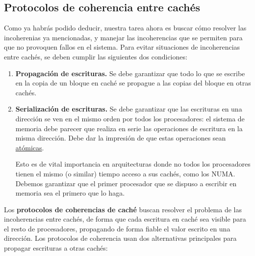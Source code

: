 \subsection{Protocolos de coherencia entre cachés}
Como ya habrás podido deducir, nuestra tarea ahora es buscar cómo resolver las incoherenias ya mencionadas, y manejar las incoherencias que se permiten para que no provoquen fallos en el sistema. Para evitar situaciones de incoherencias entre cachés, se deben cumplir las siguientes dos condiciones:
\begin{enumerate}
    \item \textbf{Propagación de escrituras.} Se debe garantizar que todo lo que se escribe en la copia de un bloque en caché se propague a las copias del bloque en otras cachés.
    \item \textbf{Serialización de escrituras.} Se debe garantizar que las escrituras en una dirección se ven en el mismo orden por todos los procesadores: el sistema de memoria debe parecer que realiza en serie las operaciones de escritura en la misma dirección. Debe dar la impresión de que estas operaciones sean \underline{atómicas}. 

        Esto es de vital importancia en arquitecturas donde no todos los procesadores tienen el mismo (o similar) tiempo acceso a sus cachés, como los NUMA\@. Debemos garantizar que el primer procesador que se dispuso a escribir en memoria sea el primero que lo haga.
\end{enumerate}
Los \textbf{protocolos de coherencias de caché} buscan resolver el problema de las incoherencias entre cachés, de forma que cada escritura en caché sea visible para el resto de procesadores, propagando de forma fiable el valor escrito en una dirección. Los protocolos de coherencia usan dos alternativas principales para propagar escrituras a otras cachés:
